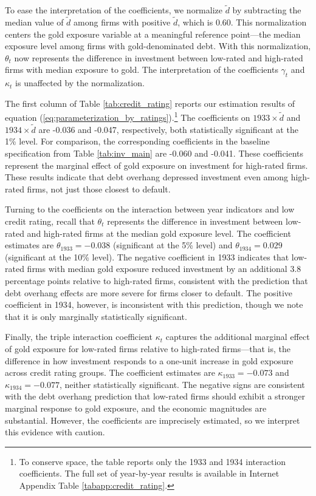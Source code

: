 To ease the interpretation of the coefficients, we normalize $\tilde{d}$ by subtracting the median value of $\tilde{d}$ among firms with positive $\tilde{d}$, which is 0.60. This normalization centers the gold exposure variable at a meaningful reference point---the median exposure level among firms with gold-denominated debt. With this normalization, $\theta_t$ now represents the difference in investment between low-rated and high-rated firms with median exposure to gold. The interpretation of the coefficients $\gamma_t$ and $\kappa_t$ is unaffected by the normalization.

The first column of Table \ref{tab:credit_rating} reports our estimation results of equation (\ref{eq:parameterization_by_ratings}).\footnote{To conserve space, the table reports only the 1933 and 1934 interaction coefficients. The full set of year-by-year results is available in Internet Appendix Table \ref{tabapp:credit_rating}.} The coefficients on $1933 \times \tilde{d}$ and $1934 \times \tilde{d}$ are -0.036 and -0.047, respectively, both statistically significant at the 1\% level. For comparison, the corresponding coefficients in the baseline specification from Table \ref{tab:inv_main} are -0.060 and -0.041. These coefficients represent the marginal effect of gold exposure on investment for high-rated firms. These results indicate that debt overhang depressed investment even among high-rated firms, not just those closest to default.

Turning to the coefficients on the interaction between year indicators and low credit rating, recall that $\theta_t$ represents the difference in investment between low-rated and high-rated firms at the median gold exposure level. The coefficient estimates are $\theta_{1933} = -0.038$ (significant at the 5\% level) and $\theta_{1934} = 0.029$ (significant at the 10\% level). The negative coefficient in 1933 indicates that low-rated firms with median gold exposure reduced investment by an additional 3.8 percentage points relative to high-rated firms, consistent with the prediction that debt overhang effects are more severe for firms closer to default. The positive coefficient in 1934, however, is inconsistent with this prediction, though we note that it is only marginally statistically significant.

Finally, the triple interaction coefficient $\kappa_t$ captures the additional marginal effect of gold exposure for low-rated firms relative to high-rated firms---that is, the difference in how investment responds to a one-unit increase in gold exposure across credit rating groups. The coefficient estimates are $\kappa_{1933} = -0.073$ and $\kappa_{1934} = -0.077$, neither statistically significant. The negative signs are consistent with the debt overhang prediction that low-rated firms should exhibit a stronger marginal response to gold exposure, and the economic magnitudes are substantial. However, the coefficients are imprecisely estimated, so we interpret this evidence with caution.

